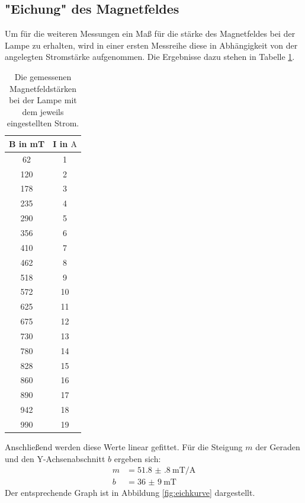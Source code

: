 \documentclass[
  bibliography=totoc,     %
  captions=tableheading,  %
  titlepage=firstiscover, %
]{scrartcl}
\begin{document}
\subsection{"Eichung" des Magnetfeldes}
Um für die weiteren Messungen ein Maß für die stärke des Magnetfeldes bei der Lampe
zu erhalten, wird in einer ersten Messreihe diese in Abhängigkeit von der angelegten
Stromstärke aufgenommen.
Die Ergebnisse dazu stehen in Tabelle \ref{tab:eichung}.
\begin{table}[H]
  \centering
  \caption{Die gemessenen Magnetfeldstärken bei der Lampe mit dem jeweils eingestellten Strom.}
  \label{tab:eichung}
  \begin{tabular}{c c}
    \toprule
    B in \si{\milli\tesla} & I in $\si{\ampere}$ \\
    \midrule
    62  & 1 \\
    120 & 2 \\
    178 & 3 \\
    235 & 4 \\
    290 & 5 \\
    356 & 6 \\
    410 & 7 \\
    462 & 8 \\
    518 & 9 \\
    572 & 10 \\
    625 & 11 \\
    675 & 12 \\
    730 & 13 \\
    780 & 14 \\
    828 & 15 \\
    860 & 16 \\
    890 & 17 \\
    942 & 18 \\
    990 & 19 \\
    \bottomrule
  \end{tabular}
\end{table}
\clearpage
\noindent
Anschließend werden diese Werte linear gefittet.
Für die Steigung $m$ der Geraden und den Y-Achsenabschnitt $b$ ergeben sich:
\begin{align*}
  m &= \SI{51.8(8)}{\milli\tesla\per\ampere}\\
  b &= \SI{36(9)}{\milli\tesla}
\end{align*}
Der entsprechende Graph ist in Abbildung \ref{fig:eichkurve} dargestellt.
\end{document}
